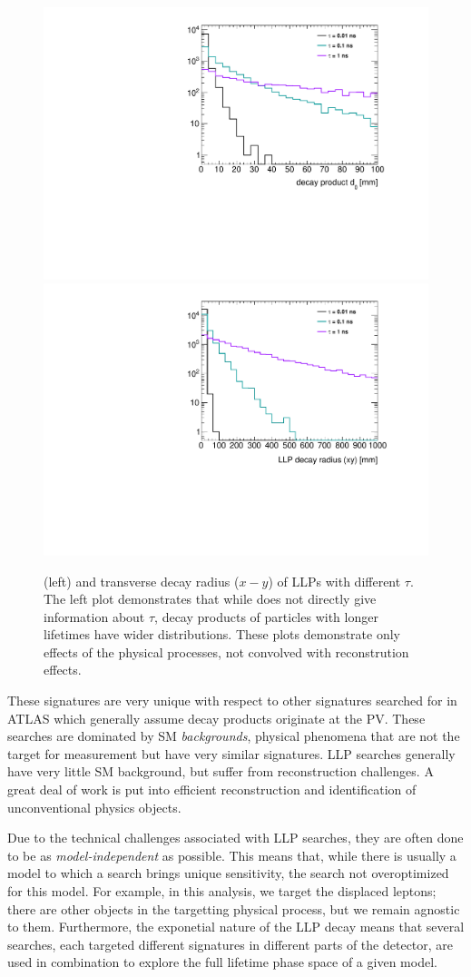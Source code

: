 
\begin{figure}[htbp]
\centering
\includegraphics[width=.48\textwidth]{figures/theory/signal_d0.pdf}
\includegraphics[width=.48\textwidth]{figures/theory/signal_rxy.pdf}
\caption{\dzero (left) and transverse decay radius ($x-y$) of \ac{LLP}s with different $\tau$. The left plot demonstrates that while \dzero does not directly give information about $\tau$, decay products of particles with longer lifetimes have wider \dzero distributions. These plots demonstrate only effects of the physical processes, not convolved with reconstrution effects.}
\label{fig:d0-rltns}
\end{figure}


These signatures are very unique with respect to other signatures searched for in \ac{ATLAS} which generally assume decay products originate at the \ac{PV}. These searches are dominated by \ac{SM} \emph{backgrounds}, physical phenomena that are not the target for measurement but have very similar signatures. \ac{LLP} searches generally have very little \ac{SM} background, but suffer from reconstruction challenges. A great deal of work is put into efficient reconstruction and identification of unconventional physics objects.

Due to the technical challenges associated with \ac{LLP} searches, they are often done to be as \emph{model-independent} as possible. This means that, while there is usually a model to which a search brings unique sensitivity, the search not overoptimized for this model. For example, in this analysis, we target the displaced leptons; there are other objects in the targetting physical process, but we remain agnostic to them. Furthermore, the exponetial nature of the \ac{LLP} decay means that several searches, each targeted different signatures in different parts of the detector, are used in combination to explore the full lifetime phase space of a given model.




